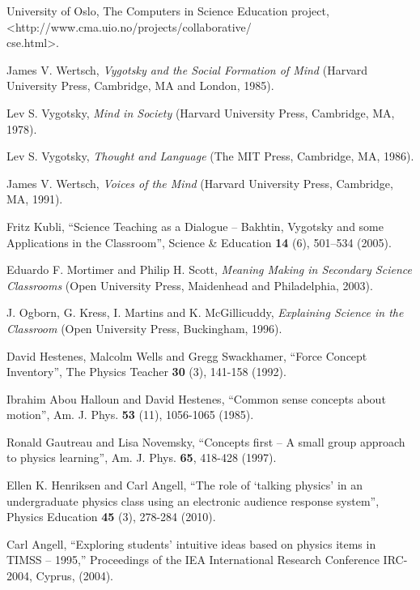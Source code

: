 \documentclass[aps,prb,floatfix,twocolumn,twoside,english]{revtex4-1}
\begin{document}
\begin{thebibliography}{99}

University of Oslo, The {C}omputers in {S}cience {E}ducation project, <http://www.cma.uio.no/projects/collaborative/\\cse.html>.

James V. Wertsch, \textsl{Vygotsky and the Social Formation of Mind} (Harvard University Press, Cambridge, MA and London, 1985).

Lev S. Vygotsky, \textsl{Mind in Society} (Harvard University Press, Cambridge, MA, 1978).

Lev S. Vygotsky, \textsl{Thought and Language} (The MIT Press, Cambridge, MA, 1986).

James V. Wertsch, \textsl{Voices of the Mind} (Harvard University Press, Cambridge, MA, 1991).

Fritz Kubli, ``Science Teaching as a Dialogue -- {B}akhtin, {V}ygotsky and some Applications in the Classroom'', Science \& Education {\bf 14} (6), 501--534 (2005).

Eduardo F. Mortimer and Philip H. Scott, \textsl{Meaning Making in Secondary Science Classrooms} (Open University Press, Maidenhead and Philadelphia, 2003).

J. Ogborn, G. Kress, I. Martins and K. McGillicuddy, \textsl{Explaining Science in the Classroom} (Open University Press, Buckingham, 1996).

David Hestenes, Malcolm Wells and Gregg Swackhamer, ``Force Concept Inventory'', The Physics Teacher {\bf 30} (3), 141-158 (1992).

Ibrahim Abou Halloun and David Hestenes, ``Common sense concepts about motion'', Am. J. Phys. {\bf 53} (11), 1056-1065 (1985).

Ronald Gautreau and Lisa Novemsky, ``Concepts first -- A small group approach to physics learning'', Am. J. Phys. {\bf 65}, 418-428 (1997).

Ellen K. Henriksen and Carl Angell, ``The role of `talking physics' in an undergraduate physics class using an electronic audience response system'', Physics Education {\bf 45} (3), 278-284 (2010).

Carl Angell, ``Exploring students' intuitive ideas based on physics items in {TIMSS} -- 1995,'' Proceedings of the IEA International Research Conference IRC-2004, Cyprus, (2004).


\end{thebibliography}
\end{document}
